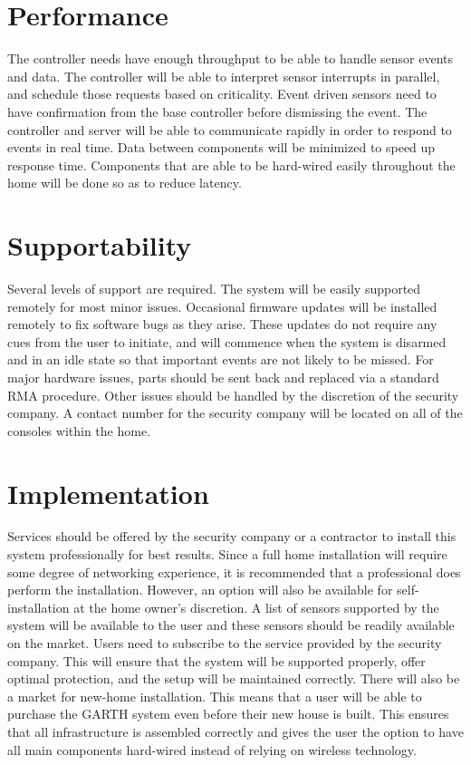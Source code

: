 \documentclass{report}
\begin{document}
\section{Performance}
The controller needs have enough throughput to be able to handle sensor events
and data. The controller will be able to interpret sensor interrupts in parallel, and 
schedule those requests based on criticality. Event driven sensors need to have
confirmation from the base controller before dismissing the event. The
controller and server will be able to communicate rapidly in order to respond
to events in real time. Data between components will be minimized to speed up
response time. Components that are able to be hard-wired easily throughout the
home will be done so as to reduce latency.

\section{Supportability}
Several levels of support are required. The system will be easily supported
remotely for most minor issues. Occasional firmware updates will be installed
remotely to fix software bugs as they arise. These updates do not require any cues
from the user to initiate, and will commence when the system is disarmed and
in an idle state so that important events are not likely to be missed. For major hardware
issues, parts should be sent back and replaced via a standard RMA procedure. 
Other issues should be handled by the  discretion of the security company. A 
contact number for the security company will be located on all of the consoles 
within the home.

\section{Implementation}
Services should be offered by the security company or a contractor to install
this system professionally for best results. Since a full home installation will
require some degree of networking experience, it is recommended that a
professional does perform the installation. However, an option will also be available
for self-installation at the home owner's discretion. A list of sensors
supported by the system will be available to the user and these sensors should be
readily available on the market. Users need to subscribe to the service
provided by the security company. This will ensure that the system will be
supported properly, offer optimal protection, and the setup will be maintained
correctly. There will also be a market for new-home installation. This means that
a user will be able to purchase the GARTH system even before their new house is
built. This ensures that all infrastructure is assembled correctly and gives the user
the option to have all main components hard-wired instead of relying on wireless
technology.
\end{document}

